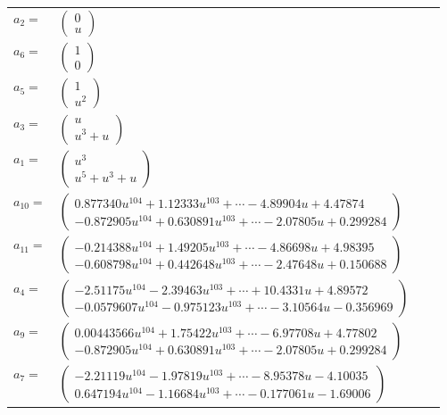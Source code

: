 \documentclass[1p]{elsarticle_modified}
\theoremstyle{definition}
\begin{document}
\begin{tabular}{m{7pt} m{180pt} m{7pt} m{180pt} }
\flushright $a_{2}=$&$\begin{pmatrix}0\\u\end{pmatrix}$ \\
\flushright $a_{6}=$&$\begin{pmatrix}1\\0\end{pmatrix}$ \\
\flushright $a_{5}=$&$\begin{pmatrix}1\\u^2\end{pmatrix}$ \\
\flushright $a_{3}=$&$\begin{pmatrix}u\\u^3+u\end{pmatrix}$ \\
\flushright $a_{1}=$&$\begin{pmatrix}u^3\\u^5+u^3+u\end{pmatrix}$ \\
\flushright $a_{10}=$&$\begin{pmatrix}0.877340 u^{104}+1.12333 u^{103}+\cdots-4.89904 u+4.47874\\-0.872905 u^{104}+0.630891 u^{103}+\cdots-2.07805 u+0.299284\end{pmatrix}$ \\
\flushright $a_{11}=$&$\begin{pmatrix}-0.214388 u^{104}+1.49205 u^{103}+\cdots-4.86698 u+4.98395\\-0.608798 u^{104}+0.442648 u^{103}+\cdots-2.47648 u+0.150688\end{pmatrix}$ \\
\flushright $a_{4}=$&$\begin{pmatrix}-2.51175 u^{104}-2.39463 u^{103}+\cdots+10.4331 u+4.89572\\-0.0579607 u^{104}-0.975123 u^{103}+\cdots-3.10564 u-0.356969\end{pmatrix}$ \\
\flushright $a_{9}=$&$\begin{pmatrix}0.00443566 u^{104}+1.75422 u^{103}+\cdots-6.97708 u+4.77802\\-0.872905 u^{104}+0.630891 u^{103}+\cdots-2.07805 u+0.299284\end{pmatrix}$ \\
\flushright $a_{7}=$&$\begin{pmatrix}-2.21119 u^{104}-1.97819 u^{103}+\cdots-8.95378 u-4.10035\\0.647194 u^{104}-1.16684 u^{103}+\cdots-0.177061 u-1.69006\end{pmatrix}$ \\

\end{tabular}
\end{document}
